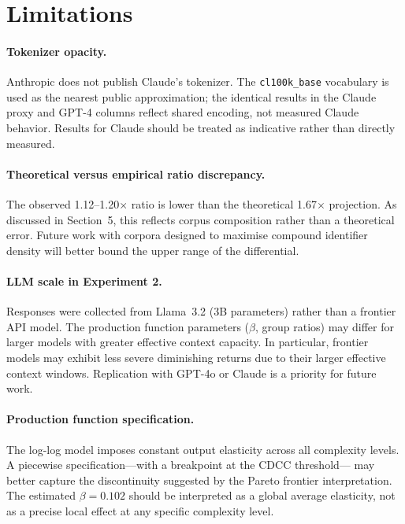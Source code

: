 \documentclass[11pt,a4paper]{article}
\begin{document}
\section{Limitations}
\label{sec:limits}

\paragraph{Tokenizer opacity.}
Anthropic does not publish Claude's tokenizer. The \texttt{cl100k\_base}
vocabulary is used as the nearest public approximation; the identical
results in the Claude proxy and GPT-4 columns reflect shared encoding,
not measured Claude behavior. Results for Claude should be treated as
indicative rather than directly measured.

\paragraph{Theoretical versus empirical ratio discrepancy.}
The observed 1.12--1.20$\times$ ratio is lower than the theoretical
1.67$\times$ projection. As discussed in Section~5, this reflects corpus
composition rather than a theoretical error. Future work with corpora
designed to maximise compound identifier density will better bound the
upper range of the differential.

\paragraph{LLM scale in Experiment 2.}
Responses were collected from Llama~3.2 (3B parameters) rather than a
frontier API model. The production function parameters ($\beta$, group ratios)
may differ for larger models with greater effective context capacity.
In particular, frontier models may exhibit less severe diminishing returns
due to their larger effective context windows. Replication with GPT-4o or
Claude is a priority for future work.

\paragraph{Production function specification.}
The log-log model imposes constant output elasticity across all complexity
levels. A piecewise specification---with a breakpoint at the CDCC threshold---
may better capture the discontinuity suggested by the Pareto frontier
interpretation. The estimated $\beta = 0.102$ should be interpreted as a
global average elasticity, not as a precise local effect at any specific
complexity level.
\end{document}
